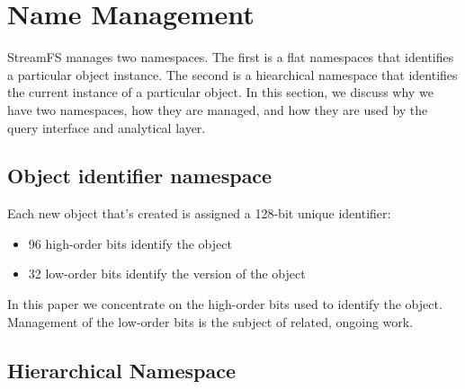 \section{Name Management}

StreamFS manages two namespaces.  The first is a flat namespaces that identifies a particular
object instance.  The second is a hiearchical namespace that identifies the current instance
of a particular object.  In this section, we discuss why we have two namespaces, how
they are managed, and how they are used by the query interface and analytical layer.

\subsection{Object identifier namespace}
Each new object that's created is assigned a 128-bit unique identifier:

\begin{itemize}
\item 96 high-order bits identify the object
\item 32 low-order bits identify the version of the object
\end{itemize}

In this paper we concentrate on the high-order bits used to identify the object.  Management of the low-order
bits is the subject of related, ongoing work.

\subsection{Hierarchical Namespace}

